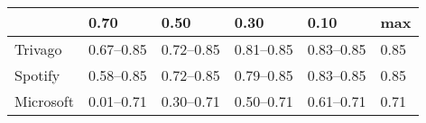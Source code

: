 \begin{tabular}{llllll}
\toprule
 & \num{0.70} & \num{0.50} & \num{0.30} & \num{0.10} & max \\
\midrule
Trivago & \numrange{0.67}{0.85} & \numrange{0.72}{0.85} & \numrange{0.81}{0.85} & \numrange{0.83}{0.85} & \num{0.85} \\
Spotify & \numrange{0.58}{0.85} & \numrange{0.72}{0.85} & \numrange{0.79}{0.85} & \numrange{0.83}{0.85} & \num{0.85} \\
Microsoft & \numrange{0.01}{0.71} & \numrange{0.30}{0.71} & \numrange{0.50}{0.71} & \numrange{0.61}{0.71} & \num{0.71} \\
\bottomrule
\end{tabular}

